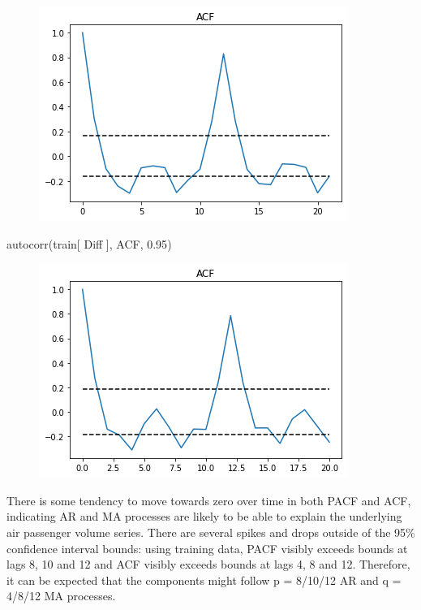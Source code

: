 \documentclass[
  letterpaper,
  DIV=11,
  numbers=noendperiod]{scrartcl}
\newenvironment{Shaded}{\begin{snugshade}}{\end{snugshade}}
\newcommand{\FloatTok}[1]{\textcolor[rgb]{0.68,0.00,0.00}{#1}}
\newcommand{\NormalTok}[1]{\textcolor[rgb]{0.00,0.23,0.31}{#1}}
\newcommand{\StringTok}[1]{\textcolor[rgb]{0.13,0.47,0.30}{#1}}
\begin{document}
\begin{figure}[H]

{\centering \includegraphics{main_files/figure-pdf/cell-18-output-1.png}

}

\end{figure}

\begin{Shaded}
\begin{Highlighting}[]
\NormalTok{autocorr(train[ }\StringTok{\textquotesingle{}Diff\textquotesingle{}}\NormalTok{ ], }\StringTok{\textquotesingle{}ACF\textquotesingle{}}\NormalTok{, }\FloatTok{0.95}\NormalTok{)}
\end{Highlighting}
\end{Shaded}

\begin{figure}[H]

{\centering \includegraphics{main_files/figure-pdf/cell-19-output-1.png}

}

\end{figure}

There is some tendency to move towards zero over time in both PACF and
ACF, indicating AR and MA processes are likely to be able to explain the
underlying air passenger volume series. There are several spikes and
drops outside of the 95\% confidence interval bounds: using training
data, PACF visibly exceeds bounds at lags 8, 10 and 12 and ACF visibly
exceeds bounds at lags 4, 8 and 12. Therefore, it can be expected that
the components might follow p = 8/10/12 AR and q = 4/8/12 MA processes.
\end{document}
